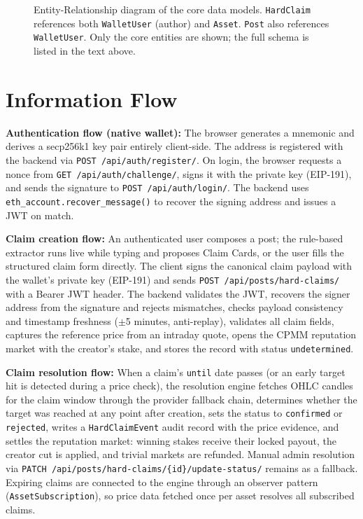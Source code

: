 \documentclass[a4paper,12pt]{report}
\begin{document}
\begin{figure}[H]
{%
}
\caption[Entity-Relationship Diagram]{Entity-Relationship diagram of the core data models. \texttt{HardClaim} references both \texttt{WalletUser} (author) and \texttt{Asset}. \texttt{Post} also references \texttt{WalletUser}. Only the core entities are shown; the full schema is listed in the text above.}
\label{fig:er_diagram}
\end{figure}

\section{Information Flow}

\textbf{Authentication flow (native wallet):} The browser generates a mnemonic and derives a secp256k1 key pair entirely client-side. The address is registered with the backend via \texttt{POST /api/auth/register/}. On login, the browser requests a nonce from \texttt{GET /api/auth/challenge/}, signs it with the private key (EIP-191), and sends the signature to \texttt{POST /api/auth/login/}. The backend uses \texttt{eth\_account.recover\_message()} to recover the signing address and issues a JWT on match.

\textbf{Claim creation flow:} An authenticated user composes a post; the rule-based extractor runs live while typing and proposes Claim Cards, or the user fills the structured claim form directly. The client signs the canonical claim payload with the wallet's private key (EIP-191) and sends \texttt{POST /api/posts/hard-claims/} with a Bearer JWT header. The backend validates the JWT, recovers the signer address from the signature and rejects mismatches, checks payload consistency and timestamp freshness ($\pm$5 minutes, anti-replay), validates all claim fields, captures the reference price from an intraday quote, opens the CPMM reputation market with the creator's stake, and stores the record with status \texttt{undetermined}.

\textbf{Claim resolution flow:} When a claim's \texttt{until} date passes (or an early target hit is detected during a price check), the resolution engine fetches OHLC candles for the claim window through the provider fallback chain, determines whether the target was reached at any point after creation, sets the status to \texttt{confirmed} or \texttt{rejected}, writes a \texttt{HardClaimEvent} audit record with the price evidence, and settles the reputation market: winning stakes receive their locked payout, the creator cut is applied, and trivial markets are refunded. Manual admin resolution via \texttt{PATCH /api/}\allowbreak\texttt{posts/hard-claims/}\allowbreak\texttt{\{id\}/update-status/} remains as a fallback. Expiring claims are connected to the engine through an observer pattern (\texttt{AssetSubscription}), so price data fetched once per asset resolves all subscribed claims.
\end{document}
